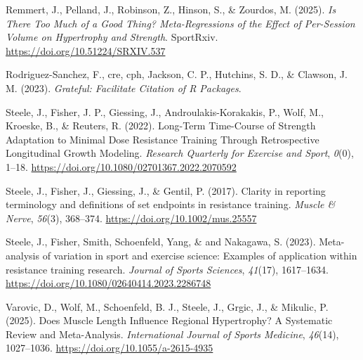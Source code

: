 \documentclass[
]{article}
\newlength{\cslhangindent}
\newenvironment{CSLReferences}[2] %
 {\begin{list}{}{%
  \setlength{\itemindent}{0pt}
  \setlength{\leftmargin}{0pt}
  \setlength{\parsep}{0pt}
  \ifodd #1
   \setlength{\leftmargin}{\cslhangindent}
   \setlength{\itemindent}{-1\cslhangindent}
  \fi
  \setlength{\itemsep}{#2\baselineskip}}}
 {\end{list}}
\begin{document}
\begin{CSLReferences}{1}{0}
Remmert, J., Pelland, J., Robinson, Z., Hinson, S., \& Zourdos, M.
(2025). \emph{Is {There Too Much} of a {Good Thing}? {Meta-Regressions}
of the {Effect} of {Per-Session Volume} on {Hypertrophy} and
{Strength}}. SportRxiv. \url{https://doi.org/10.51224/SRXIV.537}

Rodriguez-Sanchez, F., cre, cph, Jackson, C. P., Hutchins, S. D., \&
Clawson, J. M. (2023). \emph{Grateful: {Facilitate Citation} of {R
Packages}}.

Steele, J., Fisher, J. P., Giessing, J., Androulakis-Korakakis, P.,
Wolf, M., Kroeske, B., \& Reuters, R. (2022). Long-{Term Time-Course} of
{Strength Adaptation} to {Minimal Dose Resistance Training Through
Retrospective Longitudinal Growth Modeling}. \emph{Research Quarterly
for Exercise and Sport}, \emph{0}(0), 1--18.
\url{https://doi.org/10.1080/02701367.2022.2070592}

Steele, J., Fisher, J., Giessing, J., \& Gentil, P. (2017). Clarity in
reporting terminology and definitions of set endpoints in resistance
training. \emph{Muscle \& Nerve}, \emph{56}(3), 368--374.
\url{https://doi.org/10.1002/mus.25557}

Steele, J., Fisher, Smith, Schoenfeld, Yang, \& and Nakagawa, S. (2023).
Meta-analysis of variation in sport and exercise science: {Examples} of
application within resistance training research. \emph{Journal of Sports
Sciences}, \emph{41}(17), 1617--1634.
\url{https://doi.org/10.1080/02640414.2023.2286748}

Varovic, D., Wolf, M., Schoenfeld, B. J., Steele, J., Grgic, J., \&
Mikulic, P. (2025). Does {Muscle Length Influence Regional Hypertrophy}?
{A Systematic Review} and {Meta-Analysis}. \emph{International Journal
of Sports Medicine}, \emph{46}(14), 1027--1036.
\url{https://doi.org/10.1055/a-2615-4935}

\end{CSLReferences}
\end{document}
